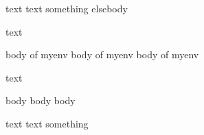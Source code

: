 text text
\if something \else elsebody
\fi

text \begin{myenv}
  body of myenv
  body of myenv
  body of myenv \end{myenv}

text

\begin{anotherenv}
  body
  body
  body
\end{anotherenv}

text text \if something \fi
